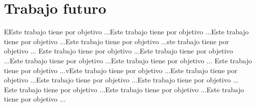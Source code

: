 \section{Trabajo futuro}
EEste trabajo tiene por objetivo ...Este trabajo tiene por objetivo ...Este trabajo tiene por objetivo ...Este trabajo tiene por objetivo ...ste trabajo tiene por objetivo ...
Este trabajo tiene por objetivo ...Este trabajo tiene por objetivo ...Este trabajo tiene por objetivo ...Este trabajo tiene por objetivo ...
Este trabajo tiene por objetivo ...vEste trabajo tiene por objetivo ...Este trabajo tiene por objetivo ...Este trabajo tiene por objetivo ...Este trabajo tiene por objetivo ...
Este trabajo tiene por objetivo ...Este trabajo tiene por objetivo ...Este trabajo tiene por objetivo ...
